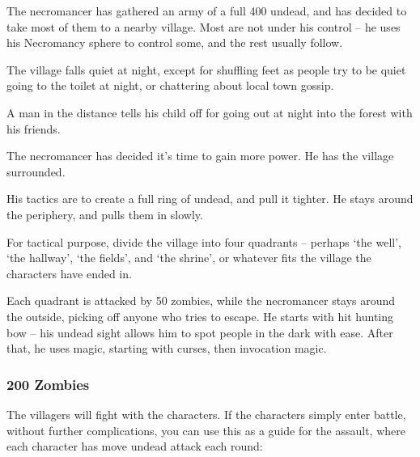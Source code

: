 The necromancer has gathered an army of a full 400 undead, and has decided to take most of them to a nearby village.  Most are not under his control -- he uses his Necromancy sphere to control some, and the rest usually follow.

\begin{boxtext}
	The village falls quiet at night, except for shuffling feet as people try to be quiet going to the toilet at night, or chattering about local town gossip.

	A man in the distance tells his child off for going out at night into the forest with his friends.
\end{boxtext}

The necromancer has decided it's time to gain more power.  He has the village surrounded.

His tactics are to create a full ring of undead, and pull it tighter.  He stays around the periphery, and pulls them in slowly.

For tactical purpose, divide the village into four quadrants -- perhaps `the well', `the hallway', `the fields', and `the shrine', or whatever fits the village the characters have ended in.

Each quadrant is attacked by 50 zombies, while the necromancer stays around the outside, picking off anyone who tries to escape.  He starts with hit hunting bow -- his undead sight allows him to spot people in the dark with ease.  After that, he uses magic, starting with curses, then invocation magic.


\subsubsection{200 Zombies}

\zombie

The villagers will fight with the characters.  If the characters simply enter battle, without further complications, you can use this as a guide for the assault, where each character has move undead attack each round:

